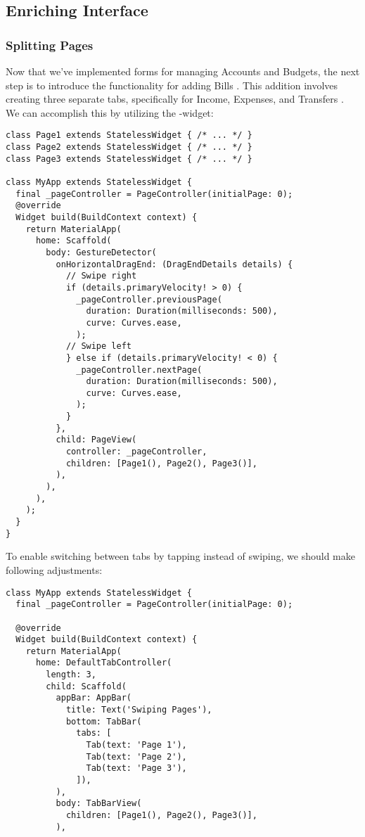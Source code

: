 
\subsection{Enriching Interface}

\subsubsection{Splitting Pages}

Now that we've implemented forms for managing Accounts and Budgets, the next step is to introduce the functionality 
for adding Bills . This addition involves creating three separate tabs, specifically for Income, Expenses, 
and Transfers . We can accomplish this by utilizing the -widget:

\begin{lstlisting}
class Page1 extends StatelessWidget { /* ... */ }
class Page2 extends StatelessWidget { /* ... */ }
class Page3 extends StatelessWidget { /* ... */ }

class MyApp extends StatelessWidget {
  final _pageController = PageController(initialPage: 0);
  @override
  Widget build(BuildContext context) {
    return MaterialApp(
      home: Scaffold(
        body: GestureDetector(
          onHorizontalDragEnd: (DragEndDetails details) {
            // Swipe right
            if (details.primaryVelocity! > 0) { 
              _pageController.previousPage(
                duration: Duration(milliseconds: 500),
                curve: Curves.ease,
              );
            // Swipe left
            } else if (details.primaryVelocity! < 0) { 
              _pageController.nextPage(
                duration: Duration(milliseconds: 500),
                curve: Curves.ease,
              );
            }
          },
          child: PageView(
            controller: _pageController,
            children: [Page1(), Page2(), Page3()],
          ),
        ),
      ),
    );
  }
}
\end{lstlisting}

\noindent To enable switching between tabs by tapping instead of swiping, we should make following adjustments:

\begin{lstlisting}
class MyApp extends StatelessWidget {
  final _pageController = PageController(initialPage: 0);

  @override
  Widget build(BuildContext context) {
    return MaterialApp(
      home: DefaultTabController(
        length: 3,
        child: Scaffold(
          appBar: AppBar(
            title: Text('Swiping Pages'),
            bottom: TabBar(
              tabs: [
                Tab(text: 'Page 1'),
                Tab(text: 'Page 2'),
                Tab(text: 'Page 3'),
              ]),
          ),
          body: TabBarView(
            children: [Page1(), Page2(), Page3()],
          ),
\end{lstlisting}

